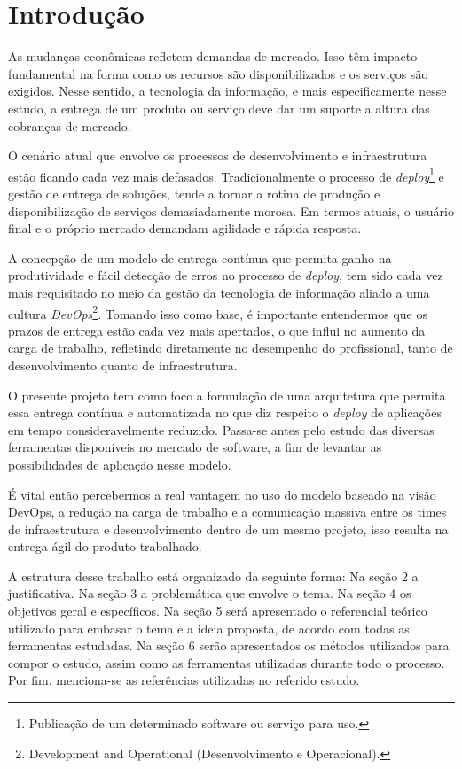 

\chapter{Introdução}\label{intro}

As mudanças econômicas refletem demandas de mercado. Isso têm impacto fundamental na forma como os recursos são disponibilizados e os serviços são exigidos. Nesse sentido, a tecnologia da informação, e mais especificamente nesse estudo, a entrega de um produto ou serviço deve dar um suporte a altura das cobranças de mercado.

O cenário atual que envolve os processos de desenvolvimento e infraestrutura estão ficando cada vez mais defasados. Tradicionalmente o processo de \textit{deploy}\footnote{Publicação de um determinado software ou serviço para uso.} e gestão de entrega de soluções, tende a tornar a rotina de produção e disponibilização de serviços demasiadamente morosa. Em termos atuais, o usuário final e o próprio mercado demandam agilidade e rápida resposta.

A concepção de um modelo de entrega contínua que permita ganho na produtividade e fácil detecção de erros no processo de \textit{deploy}, tem sido cada vez mais requisitado no meio da gestão da tecnologia de informação aliado a uma cultura \textit{DevOps}\footnote{Development and Operational (Desenvolvimento e Operacional).}. Tomando isso como base, é importante entendermos que os prazos de entrega estão cada vez mais apertados, o que influi no aumento da carga de trabalho, refletindo diretamente no desempenho do profissional, tanto de desenvolvimento quanto de infraestrutura.

O presente projeto tem como foco a formulação de uma arquitetura que permita essa entrega contínua e automatizada no que diz respeito o \textit{deploy} de aplicações em tempo consideravelmente reduzido. Passa-se antes pelo estudo das diversas ferramentas disponíveis no mercado de software, a fim de levantar as possibilidades de aplicação nesse modelo.

É vital então percebermos a real vantagem no uso do modelo baseado na visão DevOps, a redução na carga de trabalho e a comunicação massiva entre os times de infraestrutura e desenvolvimento dentro de um mesmo projeto, isso resulta na entrega ágil do produto trabalhado.

A estrutura desse trabalho está organizado da seguinte forma: Na seção 2 a justificativa. Na seção 3 a problemática que envolve o tema. Na seção 4 os objetivos geral e específicos. Na seção 5 será apresentado o referencial teórico utilizado para embasar o tema e a ideia proposta, de acordo com todas as ferramentas estudadas. Na seção 6 serão apresentados os métodos utilizados para compor o estudo, assim como as ferramentas utilizadas durante todo o processo. Por fim, menciona-se as referências utilizadas no referido estudo.